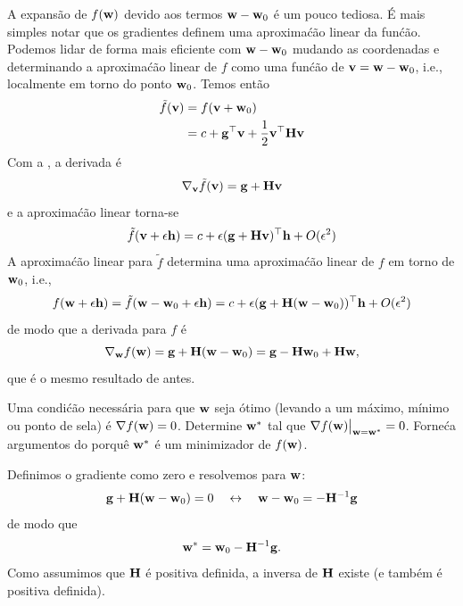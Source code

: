 \begin{exenumerate}
\begin{solution}
        A expans\~ao de $f(\mathbf{w})$ devido aos termos $\mathbf{w}-\mathbf{w}_0$ \'e um pouco
        tediosa. \'E mais simples notar que os gradientes definem uma aproxima\'c\~ao linear
        da fun\'c\~ao. Podemos lidar de forma mais eficiente com $\mathbf{w}-\mathbf{w}_0$ mudando as
        coordenadas e determinando a aproxima\'c\~ao linear de $f$ como uma fun\'c\~ao de
        $\mathbf{v} = \mathbf{w}-\mathbf{w}_0$, i.e., localmente em torno do ponto $\mathbf{w}_0$. Temos ent\~ao
        \begin{align}
            \tilde{f}(\mathbf{v}) & = f(\mathbf{v}+\mathbf{w}_0)\\
            & = c + \mathbf{g}^\top \mathbf{v} + \frac{1}{2} \mathbf{v}^\top \mathbf{H} \mathbf{v}
        \end{align}
        Com a , a derivada \'e
        \begin{equation}
            \nabla_{\mathbf{v}} \tilde{f}(\mathbf{v}) = \mathbf{g} + \mathbf{H} \mathbf{v}
        \end{equation}
        e a aproxima\'c\~ao linear torna-se
        \begin{equation}
            \tilde{f}(\mathbf{v}+\epsilon \mathbf{h}) =  c + \epsilon (\mathbf{g} + \mathbf{H} \mathbf{v})^\top \mathbf{h} + O(\epsilon^2)
        \end{equation}
        A aproxima\'c\~ao linear para $\tilde{f}$ determina uma aproxima\'c\~ao linear de $f$ em torno de $\mathbf{w}_0$, i.e.,
        \begin{equation}
            f(\mathbf{w} + \epsilon \mathbf{h}) =  \tilde{f}(\mathbf{w}-\mathbf{w}_0+\epsilon \mathbf{h}) =  c + \epsilon (\mathbf{g} + \mathbf{H} (\mathbf{w}-\mathbf{w}_0))^\top \mathbf{h} + O(\epsilon^2)
        \end{equation}
        de modo que a derivada para $f$ \'e
        \begin{equation}
            \nabla_{\mathbf{w}}f(\mathbf{w}) = \mathbf{g} + \mathbf{H} (\mathbf{w}-\mathbf{w}_0) = \mathbf{g} - \mathbf{H} \mathbf{w}_0 + \mathbf{H} \mathbf{w},
        \end{equation}
        que \'e o mesmo resultado de antes.
    \end{solution}
    
    \item Uma condi\'c\~ao necess\'aria para que $\mathbf{w}$ seja \'otimo (levando a um m\'aximo, m\'inimo ou ponto de sela) \'e $\nabla f(\mathbf{w})=0$. 
    Determine $\mathbf{w}^\ast$ tal que $\nabla f(\mathbf{w})\big|_{\mathbf{w}=\mathbf{w}^\ast}=0$. Forne\'ca argumentos do porqu\^e $\mathbf{w}^\ast$ \'e um minimizador de $f(\mathbf{w})$.
    
    \begin{solution}
        Definimos o gradiente como zero e resolvemos para $\mathbf{w}$:
        \begin{equation}
            \mathbf{g} + \mathbf{H}(\mathbf{w} -\mathbf{w}_0) = 0 \quad \leftrightarrow \quad \mathbf{w}-\mathbf{w}_0 = - \mathbf{H}^{-1} \mathbf{g}
        \end{equation}
        de modo que
        \begin{equation}
            \mathbf{w}^\ast = \mathbf{w}_0 - \mathbf{H}^{-1} \mathbf{g}.
        \end{equation}
        Como assumimos que $\mathbf{H}$ \'e positiva definida, a inversa de $\mathbf{H}$ existe (e
        tamb\'em \'e positiva definida).
        

\end{solution}
\end{exenumerate}

